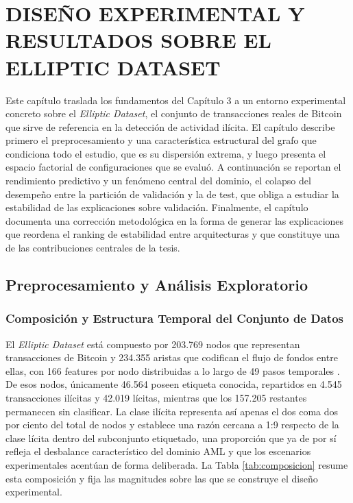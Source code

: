 \chapter{DISEÑO EXPERIMENTAL Y RESULTADOS SOBRE EL ELLIPTIC DATASET}

Este capítulo traslada los fundamentos del Capítulo 3 a un entorno experimental concreto sobre el \textit{Elliptic Dataset}, el conjunto de transacciones reales de Bitcoin que sirve de referencia en la detección de actividad ilícita. El capítulo describe primero el preprocesamiento y una característica estructural del grafo que condiciona todo el estudio, que es su dispersión extrema, y luego presenta el espacio factorial de configuraciones que se evaluó. A continuación se reportan el rendimiento predictivo y un fenómeno central del dominio, el colapso del desempeño entre la partición de validación y la de test, que obliga a estudiar la estabilidad de las explicaciones sobre validación. Finalmente, el capítulo documenta una corrección metodológica en la forma de generar las explicaciones que reordena el ranking de estabilidad entre arquitecturas y que constituye una de las contribuciones centrales de la tesis.

\section{Preprocesamiento y Análisis Exploratorio}

\subsection{Composición y Estructura Temporal del Conjunto de Datos}

El \textit{Elliptic Dataset} está compuesto por 203.769 nodos que representan transacciones de Bitcoin y 234.355 aristas que codifican el flujo de fondos entre ellas, con 166 features por nodo distribuidas a lo largo de 49 pasos temporales \cite{Weber2019Anti-MoneyForensics}. De esos nodos, únicamente 46.564 poseen etiqueta conocida, repartidos en 4.545 transacciones ilícitas y 42.019 lícitas, mientras que los 157.205 restantes permanecen sin clasificar. La clase ilícita representa así apenas el dos coma dos por ciento del total de nodos y establece una razón cercana a 1:9 respecto de la clase lícita dentro del subconjunto etiquetado, una proporción que ya de por sí refleja el desbalance característico del dominio AML y que los escenarios experimentales acentúan de forma deliberada. La Tabla \ref{tab:composicion} resume esta composición y fija las magnitudes sobre las que se construye el diseño experimental.

